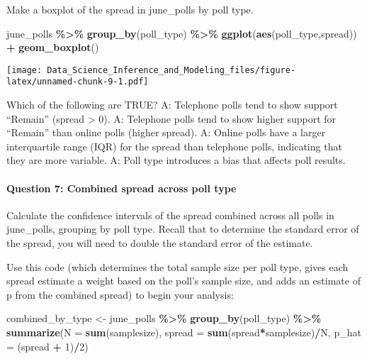 \documentclass[
]{article}
\newenvironment{Shaded}{\begin{snugshade}}{\end{snugshade}}
\newcommand{\DataTypeTok}[1]{\textcolor[rgb]{0.13,0.29,0.53}{#1}}
\newcommand{\DecValTok}[1]{\textcolor[rgb]{0.00,0.00,0.81}{#1}}
\newcommand{\KeywordTok}[1]{\textcolor[rgb]{0.13,0.29,0.53}{\textbf{#1}}}
\newcommand{\NormalTok}[1]{#1}
\newcommand{\OperatorTok}[1]{\textcolor[rgb]{0.81,0.36,0.00}{\textbf{#1}}}
\newcommand{\StringTok}[1]{\textcolor[rgb]{0.31,0.60,0.02}{#1}}
\begin{document}
Make a boxplot of the spread in june\_polls by poll type.

\begin{Shaded}
\begin{Highlighting}[]
\NormalTok{june\_polls }\OperatorTok{\%\textgreater{}\%}\StringTok{ }\KeywordTok{group\_by}\NormalTok{(poll\_type) }\OperatorTok{\%\textgreater{}\%}
\StringTok{  }\KeywordTok{ggplot}\NormalTok{(}\KeywordTok{aes}\NormalTok{(poll\_type,spread)) }\OperatorTok{+}
\StringTok{  }\KeywordTok{geom\_boxplot}\NormalTok{()}
\end{Highlighting}
\end{Shaded}

\texttt{[image: Data\_Science\_Inference\_and\_Modeling\_files/figure-latex/unnamed-chunk-9-1.pdf]}

Which of the following are TRUE? A: Telephone polls tend to show support
``Remain'' (spread \textgreater{} 0). A: Telephone polls tend to show
higher support for ``Remain'' than online polls (higher spread). A:
Online polls have a larger interquartile range (IQR) for the spread than
telephone polls, indicating that they are more variable. A: Poll type
introduces a bias that affects poll results.

\hypertarget{question-7-combined-spread-across-poll-type}{%
\paragraph{Question 7: Combined spread across poll
type}\label{question-7-combined-spread-across-poll-type}}

Calculate the confidence intervals of the spread combined across all
polls in june\_polls, grouping by poll type. Recall that to determine
the standard error of the spread, you will need to double the standard
error of the estimate.

Use this code (which determines the total sample size per poll type,
gives each spread estimate a weight based on the poll's sample size, and
adds an estimate of p from the combined spread) to begin your analysis:

\begin{Shaded}
\begin{Highlighting}[]
\NormalTok{combined\_by\_type \textless{}{-}}\StringTok{ }\NormalTok{june\_polls }\OperatorTok{\%\textgreater{}\%}
\StringTok{        }\KeywordTok{group\_by}\NormalTok{(poll\_type) }\OperatorTok{\%\textgreater{}\%}
\StringTok{        }\KeywordTok{summarize}\NormalTok{(}\DataTypeTok{N =} \KeywordTok{sum}\NormalTok{(samplesize),}
                  \DataTypeTok{spread =} \KeywordTok{sum}\NormalTok{(spread}\OperatorTok{*}\NormalTok{samplesize)}\OperatorTok{/}\NormalTok{N,}
                  \DataTypeTok{p\_hat =}\NormalTok{ (spread }\OperatorTok{+}\StringTok{ }\DecValTok{1}\NormalTok{)}\OperatorTok{/}\DecValTok{2}\NormalTok{)}
\end{Highlighting}
\end{Shaded}
\end{document}
